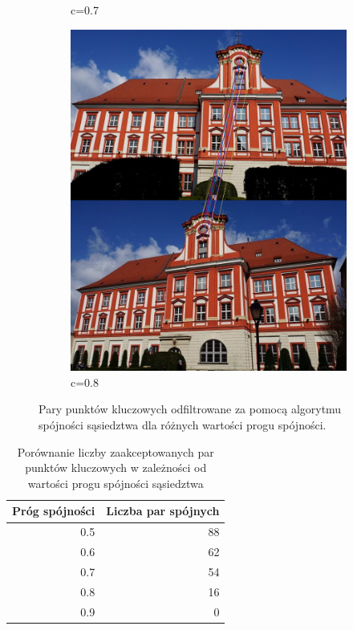\documentclass{article}
\begin{document}
\begin{figure}[H]
\begin{subfigure}[b]{0.4\linewidth}
			\caption{c=0.7}
		\end{subfigure}
		\begin{subfigure}[b]{0.4\linewidth}
			\includegraphics[width=\linewidth]{c08.png}
			\caption{c=0.8}
		\end{subfigure}
		\caption{Pary punktów kluczowych odfiltrowane za pomocą algorytmu spójności sąsiedztwa dla różnych wartości progu spójności.}
		\label{fig:cthresh}
	\end{figure}

	\begin{table}[H]
		\centering
		\caption{Porównanie liczby zaakceptowanych par punktów kluczowych w zależności od wartości progu spójności sąsiedztwa}
		\begin{tabular}{|r|r|}
			\hline
			\multicolumn{1}{|c|}{\textbf{Próg spójności}} & \multicolumn{1}{c|}{\textbf{Liczba par spójnych}} \\ \hline
			0.5                                           & 88                                                \\ \hline
			0.6                                           & 62                                                \\ \hline
			0.7                                           & 54                                                \\ \hline
			0.8                                           & 16                                                \\ \hline
			0.9                                           & 0                                                 \\ \hline
		\end{tabular}
	\end{table}
	
\end{document}

